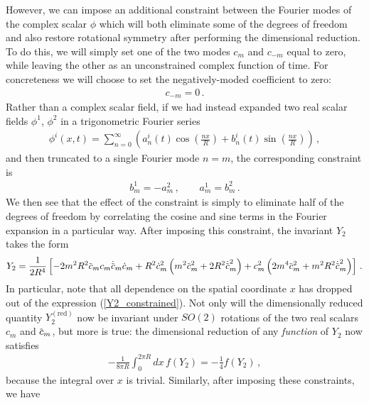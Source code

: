 \documentclass[12pt]{article}
\numberwithin{equation}{section}
\newcommand{\overbar}[1]{\mkern 1.5mu\overline{\mkern-1.5mu#1\mkern-1.5mu}\mkern 1.5mu}
\def\cbar{{\overbar{c}}}
\begin{document}
However, we can impose an additional constraint between the Fourier modes of the complex scalar $\phi$ which will both eliminate some of the degrees of freedom and also restore rotational symmetry after performing the dimensional reduction. To do this, we will simply set one of the two modes $c_m$ and $c_{-m}$ equal to zero, while leaving the other as an unconstrained complex function of time. For concreteness we will choose to set the negatively-moded coefficient to zero:
%
\begin{align}\label{half_dof_constraint}
    c_{-m} = 0 \, .
\end{align}
%
Rather than a complex scalar field, if we had instead expanded two real scalar fields $\phi^1$, $\phi^2$ in a trigonometric Fourier series
%
\begin{align}
    \phi^i ( x, t ) = \sum_{n=0}^{\infty} \left( a_n^i ( t ) \cos \left( \frac{n x}{R} \right) + b_n^i ( t ) \sin \left( \frac{n x}{R} \right) \right) \, , 
\end{align}
%
and then truncated to a single Fourier mode $n = m$, the corresponding constraint is
%
\begin{align}
    b_m^1 = - a_m^2 \, , \qquad a_m^1 = b_m^2 \, .
\end{align}
%
We then see that the effect of the constraint is simply to eliminate half of the degrees of freedom by correlating the cosine and sine terms in the Fourier expansion in a particular way. After imposing this constraint, the invariant $Y_2$ takes the form
%
\begin{align}\label{Y2_constrained}
    Y_2 = \frac{1}{2 R^4} \left[ -2 m^2 R^2 \cbar_{m} c_m \dot{\cbar}_{m} \dot{c}_m + R^2 \dot{c}_{m}^2 \left( m^2 \cbar_m^2 + 2 R^2 \dot{\cbar}_m^2 \right) + c_{m}^2 \left( 2 m^4 \cbar_m^2 + m^2 R^2 \dot{\cbar}_m^2 \right) \right] \, .
\end{align}
%
In particular, note that all dependence on the spatial coordinate $x$ has dropped out of the expression (\ref{Y2_constrained}). Not only will the dimensionally reduced quantity $Y_2^{(\text{red})}$ now be invariant under $SO(2)$ rotations of the two real scalars $c_{m}$ and $\cbar_m$, but more is true: the dimensional reduction of any \emph{function} of $Y_2$ now satisfies
%
\begin{align}
    - \frac{1}{8 \pi R} \int_0^{2 \pi R} dx \, f \left( Y_2 \right) = - \frac{1}{4} f \left( Y_2 \right) \, , 
\end{align}
%
because the integral over $x$ is trivial. Similarly, after imposing these constraints, we have
\end{document}
